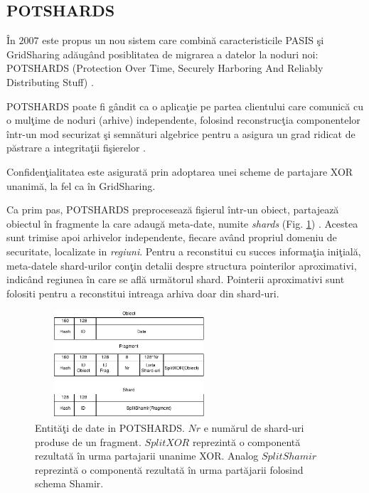 \documentclass{llncs}
\begin{document}
\subsection{POTSHARDS} 
\label{sec:desc_potshards}
\^{I}n $2007$ este propus un nou sistem care combin\u{a} caracteristicile PASIS \c{s}i GridSharing ad\u{a}ug\^{a}nd posiblitatea de migrarea a datelor la noduri noi: POTSHARDS (Protection Over Time, Securely Harboring And Reliably Distributing Stuff) \cite{SGMV:2009}.


POTSHARDS poate fi g\^{a}ndit ca o aplica\c{t}ie pe partea clientului care comunic\u{a} cu o mul\c{t}ime de noduri (arhive) independente, folosind reconstruc\c{t}ia componentelor \^{i}ntr-un mod securizat \c{s}i semn\u{a}turi algebrice pentru a asigura un grad ridicat de p\u{a}strare a integrita\c{t}ii fi\c{s}ierelor \cite{STM:2006}.

Confiden\c{t}ialitatea este asigurat\u{a} prin adoptarea unei scheme de partajare XOR unanim\u{a}, la fel ca \^{i}n GridSharing.

Ca prim pas, POTSHARDS preproceseaz\u{a} fi\c{s}ierul \^{i}ntr-un obiect, partajeaz\u{a} obiectul \^{i}n fragmente la care adaug\u{a} meta-date, numite \textit{shards} (Fig. \ref{fig:data-potshard}) \cite{SGMV:2009}. Acestea sunt trimise apoi arhivelor independente, fiecare av\^{a}nd propriul domeniu de securitate, localizate in \textit{regiuni}. Pentru a reconstitui cu succes informa\c{t}ia ini\c{t}ial\u{a}, meta-datele shard-urilor con\c{t}in detalii despre structura pointerilor aproximativi, indic\^{a}nd regiunea \^{i}n care se afl\u{a} urm\u{a}torul shard. Pointerii aproximativi sunt folositi pentru a reconstitui intreaga arhiva doar din shard-uri.

\begin{figure}
	\begin{center}
	\includegraphics[width=7cm, height=4cm]{img/Shards.png}    %
	\caption{Entit\u{a}\c{t}i de date in POTSHARDS. $Nr$ e num\u{a}rul de shard-uri produse de un fragment.
		$SplitXOR$ reprezint\u{a} o component\u{a} rezultat\u{a} \^{i}n urma partajarii unanime XOR. Analog $SplitShamir$ reprezint\u{a} o component\u{a} rezultat\u{a} \^{i}n urma part\u{a}jarii folosind schema Shamir. \cite{SGMV:2009}}
	\label{fig:data-potshard}
	\bigskip
	\end{center}
\end{figure}
\end{document}
